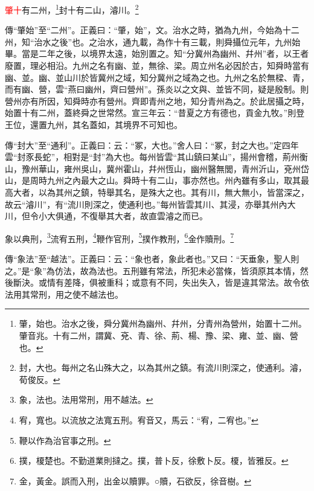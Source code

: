 \textcolor{red}{肇十}有二州，\footnote{肇，始也。治水之後，舜分冀州為幽州、幷州，分青州為營州，始置十二州。肇音兆。十有二州，謂冀、兗、青、徐、荊、楊、豫、梁、雍、並、幽、營也。}封十有二山，濬川。\footnote{封，大也。每州之名山殊大之，以為其州之鎮。有流川則深之，使通利。濬，荀俊反。}

{\noindent\zhuan{}\fzbyks 傳“肇始”至“二州”。正義曰：“肇，始”，文。治水之時，猶為九州，今始為十二州，知“治水之後”也。之治水，通九載，為作十有三載，則舜攝位元年，九州始畢。當是二年之後，以境界太遠，始別置之。知“分冀州為幽州、幷州”者，以王者廢置，理必相沿。九州之名有幽、並，無徐、梁。周立州名必因於古，知舜時當有幽、並。幽、並山川於皆冀州之域，知分冀州之域為之也。九州之名於無樑、青，而有幽、營，雲“燕曰幽州，齊曰營州”。孫炎以之文與、並皆不同，疑是殷制。則營州亦有所因，知舜時亦有營州。齊即青州之地，知分青州為之。於此居攝之時，始置十有二州，蓋終舜之世常然。宣三年云：“昔夏之方有德也，貢金九牧。”則登王位，還置九州，其名蓋如，其境界不可知也。 \par}

{\noindent\zhuan{}\fzbyks 傳“封大”至“通利”。正義曰：云：“冢，大也。”舍人曰：“冢，封之大也。”定四年雲“封豕長蛇”，相對是“封”為大也。每州皆雲“其山鎮曰某山”，揚州會稽，荊州衡山，豫州華山，雍州吳山，冀州霍山，幷州恆山，幽州醫無閭，青州沂山，兗州岱山，是周時九州之內最大之山。舜時十有二山，事亦然也。州內雖有多山，取其最高大者，以為其州之鎮，特舉其名，是殊大之也。其有川，無大無小，皆當深之，故云“濬川”，有“流川則深之，使通利也。”每州皆雲其川、其浸，亦舉其州內大川，但令小大俱通，不復舉其大者，故直雲濬之而已。 \par}

象以典刑，\footnote{象，法也。法用常刑，用不越法。}流宥五刑，\footnote{宥，寬也。以流放之法寬五刑。宥音又，馬云：“宥，二宥也。”}鞭作官刑，\footnote{鞭以作為治官事之刑。}撲作教刑，\footnote{撲，榎楚也。不勤道業則撻之。撲，普卜反，徐敷卜反。榎，皆雅反。}金作贖刑。\footnote{金，黃金。誤而入刑，出金以贖罪。○贖，石欲反，徐音樹。}

{\noindent\zhuan{}\fzbyks 傳“象法”至“越法”。正義曰：云：“象也者，象此者也。”又曰：“天垂象，聖人則之。”是“象”為仿法，故為法也。五刑雖有常法，所犯未必當條，皆須原其本情，然後斷決。或情有差降，俱被重科；或意有不同，失出失入，皆是違其常法。故令依法用其常刑，用之使不越法也。 \par}

